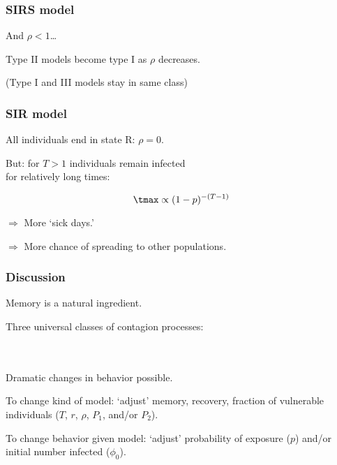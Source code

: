 \begin{frame}
  \frametitle{SIRS model}

  And $\rho<1$\ldots \hfill

  Type II models become type I as $\rho$ decreases.

  (Type I and III models stay in same class)


\end{frame}

\begin{frame}
  \frametitle{SIR model}
  
  All individuals end in state R: $\rho=0$.

  But: for $T>1$ individuals remain infected\\ 
  for relatively long times:

  $$ \tmax \propto (1-p)^{-(T-1)} $$

  $\Rightarrow$ More `sick days.'

  $\Rightarrow$ More chance of spreading to
  other populations.
\end{frame}

%
%  

%  

 

\begin{frame}
  \frametitle{Discussion}

   Memory is a natural ingredient. %

   Three universal classes of contagion processes:\\
  \qquad {}\\
  \qquad {} \\ %
  \qquad {}

   Dramatic changes in behavior possible.

   To change kind of model: `adjust' memory, recovery, fraction
  of vulnerable individuals ($T$, $r$, $\rho$, $P_1$, and/or $P_2$).

   To change behavior given model: `adjust' probability
  of exposure ($p$) and/or initial number infected ($\phi_0$).
\end{frame}

